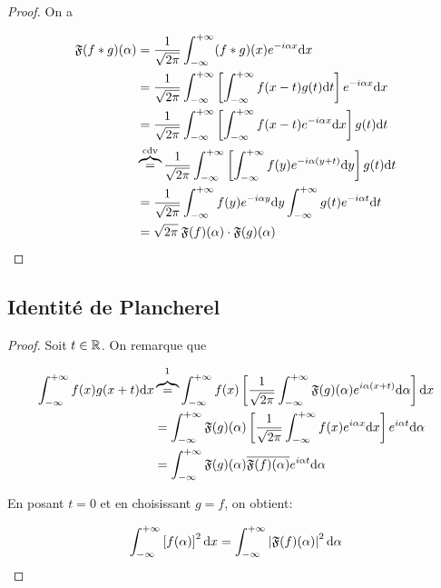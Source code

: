 \begin{proof}
    On a
    
    \begin{align*}
    \mathfrak{F}(f\ast g)(\alpha) &=
    \frac{1}{\sqrt{2 \pi}} \int_{-\infty}^{+\infty} (f\ast g)(x) e^{-i\alpha x} \mathrm{d}x
    \\&=
    \frac{1}{\sqrt{2 \pi}} \int_{-\infty}^{+\infty} \left[\int_{-\infty}^{+\infty} f(x-t)g(t)\mathrm{d}t\right] e^{-i\alpha x} \mathrm{d}x
    \\&=
    \frac{1}{\sqrt{2 \pi}} \int_{-\infty}^{+\infty} \left[\int_{-\infty}^{+\infty} f(x-t)e^{-i\alpha x}\mathrm{d}x\right] g(t) \mathrm{d}t
    \\&\overbrace{=}^{\textrm{cdv}}
    \frac{1}{\sqrt{2 \pi}} \int_{-\infty}^{+\infty} \left[\int_{-\infty}^{+\infty} f(y)e^{-i\alpha (y+t)}\mathrm{d}y\right] g(t) \mathrm{d}t
    \\&=
    \frac{1}{\sqrt{2 \pi}} \int_{-\infty}^{+\infty} f(y)e^{-i\alpha y}\mathrm{d}y \int_{-\infty}^{+\infty} g(t)e^{-i\alpha t}\mathrm{d}t
    \\&=
    \sqrt{2 \pi} \> \mathfrak{F}(f)(\alpha) \cdot \mathfrak{F}(g)(\alpha)
    \end{align*}
    
\end{proof}


\subsection{Identité de Plancherel}

\begin{proof}
    Soit $t\in \mathbb{R}$.
    On remarque que
    
    \begin{align*}
    \int_{-\infty}^{+\infty} f(x) g(x+t) \dx &\overbrace{=}^{\footnotemark}
    \int_{-\infty}^{+\infty}
    f(x)
    \left[
    \frac{1}{\sqrt{2 \pi}} \int_{-\infty}^{+\infty} \TF(g)(\alpha) e^{i\alpha (x + t)} \dal
    \right]
    \dx
    \\&=
    \int_{-\infty}^{+\infty}
    \TF(g)(\alpha)
    \left[
    \frac{1}{\sqrt{2 \pi}} \int_{-\infty}^{+\infty}
    f(x) e^{i\alpha x} \dx
    \right]
    e^{i\alpha t}
    \dal
    \\&=
    \int_{-\infty}^{+\infty}
    \TF(g)(\alpha)
    \conj{\TF(f)(\alpha)}
    e^{i\alpha t}
    \dal
    \end{align*}
    
    En posant $t = 0$ et en choisissant $g = f$, on obtient:
    
    \[
    \int_{-\infty}^{+\infty} \left[f(\alpha)\right]^2 \mathrm{d}x =
    \int_{-\infty}^{+\infty} \left|\mathfrak{F}(f)(\alpha)\right|^2 \mathrm{d}\alpha
    \]
\end{proof}


